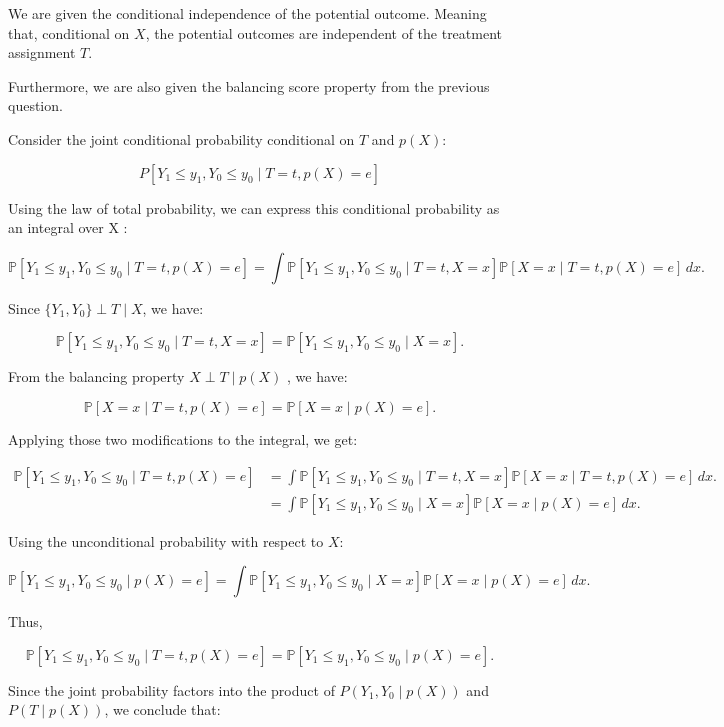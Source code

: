 \documentclass{article}
\begin{document}
We are given the conditional independence of the potential outcome. Meaning that, conditional on $X$, the potential outcomes are independent of the treatment assignment $T$.

Furthermore, we are also given the balancing score property from the previous question.

Consider the joint conditional probability conditional on $T$ and $p(X)$:

\[
P[Y_1 \leq y_1, Y_0 \leq y_0 \mid T = t, p(X) = e]
\]

Using the law of total probability, we can express this conditional probability as an integral over  X :

\[
\mathbb{P}[Y_1 \leq y_1, Y_0 \leq y_0 \mid T = t, p(X) = e] = \int \mathbb{P}[Y_1 \leq y_1, Y_0 \leq y_0 \mid T = t, X = x] \mathbb{P}[X = x \mid T = t, p(X) = e] \, dx.
\]

Since $\{Y_1, Y_0\} \perp T \mid X$, we have:

$$
\mathbb{P}[Y_1 \leq y_1, Y_0 \leq y_0 \mid T = t, X = x] = \mathbb{P}[Y_1 \leq y_1, Y_0 \leq y_0 \mid X = x].
$$

From the balancing property  $X \perp T \mid p(X)$ , we have:

$$
\mathbb{P}[X = x \mid T = t, p(X) = e] = \mathbb{P}[X = x \mid p(X) = e].
$$

Applying those two modifications to the integral, we get:

\begin{align*}
    \mathbb{P}[Y_1 \leq y_1, Y_0 \leq y_0 \mid T = t, p(X) = e]
    &= \int \mathbb{P}[Y_1 \leq y_1, Y_0 \leq y_0 \mid T = t, X = x] \mathbb{P}[X = x \mid T = t, p(X) = e] \, dx. \\
    &= \int \mathbb{P}[Y_1 \leq y_1, Y_0 \leq y_0 \mid X = x] \mathbb{P}[X = x \mid p(X) = e] \, dx.
\end{align*}

Using the unconditional probability with respect to $X$:

$$
\mathbb{P}[Y_1 \leq y_1, Y_0 \leq y_0 \mid p(X) = e] = \int \mathbb{P}[Y_1 \leq y_1, Y_0 \leq y_0 \mid X = x] \mathbb{P}[X = x \mid p(X) = e] \, dx.
$$

Thus, 

$$
\mathbb{P}[Y_1 \leq y_1, Y_0 \leq y_0 \mid T = t, p(X) = e] = \mathbb{P}[Y_1 \leq y_1, Y_0 \leq y_0 \mid p(X) = e].
$$

Since the joint probability factors into the product of \( P(Y_1, Y_0 \mid p(X)) \) and \( P(T \mid p(X)) \), we conclude that:
\end{document}
